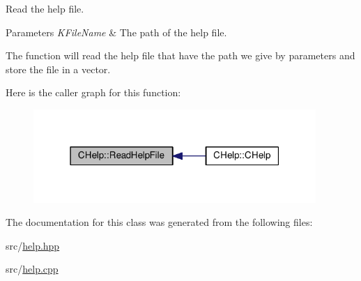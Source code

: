 Read the help file. 


\begin{DoxyParams}{Parameters}
{\em K\-File\-Name} & The path of the help file.\\
\hline
\end{DoxyParams}
The function will read the help file that have the path we give by parameters and store the file in a vector. 

Here is the caller graph for this function\-:
\nopagebreak
\begin{figure}[H]
\begin{center}
\leavevmode
\includegraphics[width=304pt]{class_c_help_a3b274aa242a0419df9193b4bcfe798c5_icgraph}
\end{center}
\end{figure}




The documentation for this class was generated from the following files\-:\begin{DoxyCompactItemize}
\item 
src/\hyperlink{help_8hpp}{help.\-hpp}\item 
src/\hyperlink{help_8cpp}{help.\-cpp}\end{DoxyCompactItemize}

